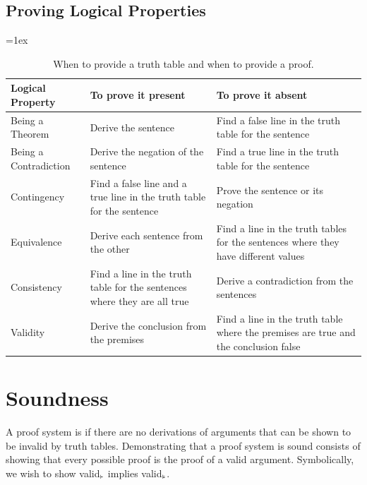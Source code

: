 \documentclass[12pt, a4paper, oneside, openright, titlepage]{book}
\begin{document}
\subsection{\textsection Proving Logical Properties}

\begin{table}[H]
\tabulinesep=1ex
\begin{tabu}{X[.5,c,m] ||X[1,l,m] |X[1,l,m]}
\textbf{Logical Property} 		&	\textbf{To prove it present} 	&	\textbf{To prove it absent} \\ \hline \hline

Being a Theorem   &	Derive the sentence & Find a false line in the truth table for the sentence	 \\ \hline
 
Being a Contradiction		&	Derive the negation of the sentence  & Find a true line in the truth table for the sentence \\ \hline

Contingency &	Find a false line and a true line in the truth table for the sentence & Prove the sentence or its negation \\ \hline

Equivalence &	Derive each sentence from the other & Find a line in the truth tables for the sentences where they have different values	\\ \hline

Consistency &	Find a line in the truth table for the sentences where they are all true	& Derive a contradiction from the sentences \\ \hline

Validity	&	Derive the conclusion from the premises & Find a line in the truth table where the premises are true and the conclusion false \\ 
\end{tabu}
\caption{When to provide a truth table and when to provide a proof.}
\label{table:prove_present_or_absent}
\end{table}



\section{\textsection Soundness}

\begin{defn}
    A proof system is  if there are no derivations of arguments that can be shown to be invalid by truth tables. Demonstrating that a proof system is sound consists of showing that every possible proof is the proof of a valid argument. Symbolically, we wish to show valid$_{\vdash}$ implies valid$_{\vDash}$.
\end{defn}
\end{document}
